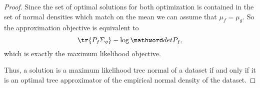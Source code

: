 \begin{prop}
\begin{proof}
Since the set of optimal solutions for both optimization is contained in the set of normal densities which match on the mean we can assume that $\mu_f = \mu_g$.
So the approximation objective is equivalent to
$$
  \tr{P_f \Sigma_g} - \log \det P_f,
$$
which is exactly the maximum likelihood objective.

Thus, a solution is a maximum likelihood tree normal of a dataset if and only if it is an optimal tree approximator of the empirical normal density of the dataset.

\end{proof}

\end{prop}
\strats
